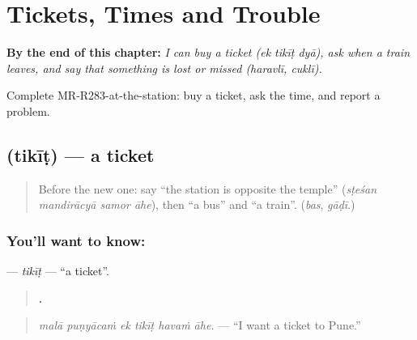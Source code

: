 
\chapter{Tickets, Times and Trouble}
\label{ch:mr-tickets-times-and-trouble}

\begin{chapteropening}
\textbf{By the end of this chapter:} \emph{I can buy a ticket (ek tikīṭ dyā), ask when a train leaves, and say that something is lost or missed (haravlī, cuklī).}

Complete MR-R283-at-the-station: buy a ticket, ask the time, and report a problem.
\end{chapteropening}

\section[\texorpdfstring{\mr{तिकीट} (tikīṭ)}{तिकीट (tikīṭ)}]{ (tikīṭ) — a ticket}

\label{lesson:MR-C283-tikit}



\begin{quote}
Before the new one: say \textquotedblleft{}the station is opposite the temple\textquotedblright{} (\emph{sṭeśan mandirācyā samor āhe}), then \textquotedblleft{}a bus\textquotedblright{} and \textquotedblleft{}a train\textquotedblright{}. (\emph{bas}, \emph{gāḍī}.)
\end{quote}

\subsection*{You'll want to know: }
\textbf{} — \emph{tikīṭ} — \textquotedblleft{}a ticket\textquotedblright{}.

\begin{quote}
\textbf{     .}
\end{quote}

\begin{quote}
\emph{malā puṇyācaṁ ek tikīṭ havaṁ āhe.} — \textquotedblleft{}I want a ticket to Pune.\textquotedblright{}
\end{quote}

